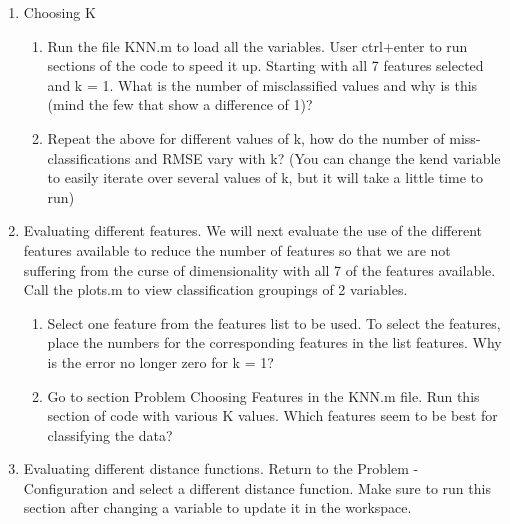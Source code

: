 \documentclass{report}
\begin{document}
\begin{enumerate}

\item Choosing K
  	
  	\begin{enumerate}
    
  	\item {
  	Run the file KNN.m to load all the variables. 
  	User ctrl+enter to run sections of the code to speed it up. 
  	Starting with all 7 features selected and k = 1.
  	What is the number of misclassified values and why is this (mind the few that show a difference of 1)?
  	}
  	
    \item {
   	Repeat the above for different values of k, how do the number of miss-classifications and RMSE vary with k? 
   	(You can change the k\textunderscore end variable to easily iterate over several values of k, but it will take a little time to run)
    }
    
	\end{enumerate}
	
\item {
Evaluating different features.
We will next evaluate the use of the different features available to reduce the number of features so that we are not suffering from the curse of dimensionality with all 7 of the features available. Call the plots.m to view classification groupings of 2 variables.
}

	\begin{enumerate}
	
	\item {	
	Select one feature from the features list to be used.
	To select the features, place the numbers for the corresponding features in the list features.
	Why is the error no longer zero for k = 1?
	}
	
	\item {
	Go to section Problem Choosing Features in the KNN.m file.
	Run this section of code with various K values.
	Which features seem to be best for classifying the data?
	}
	
	\end{enumerate}
	
\item {
Evaluating different distance functions.
Return to the Problem - Configuration and select a different distance function. 
Make sure to run this section after changing a variable to update it in the workspace.
}

	\begin{enumerate}
	

\end{enumerate}
\end{enumerate}
\end{document}

